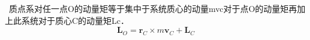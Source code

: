 \
质点系对任一点O的动量矩等于集中于系统质心的动量mvc对于点O的动量矩再加上此系统对于质心C的动量矩Lc．
\begin{equation}
\mathbf{L}_O=\mathbf{r}_C\times m \mathbf{v}_C+ \mathbf{L}_C
\end{equation}